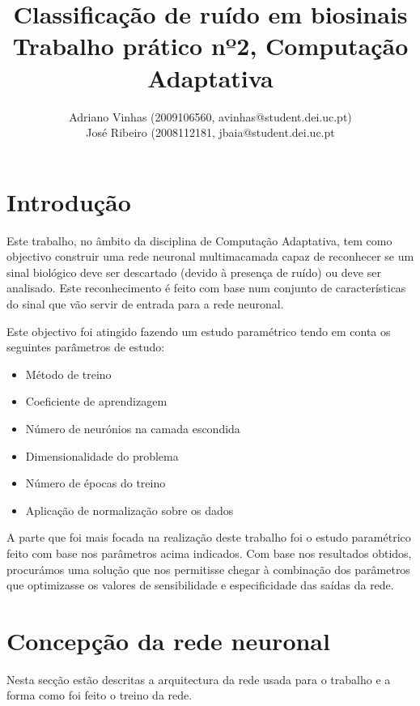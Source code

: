 \documentclass{article}
\begin{document}
\title{Classificação de ruído em biosinais \\ Trabalho prático nº2, Computação Adaptativa}
\author{Adriano Vinhas (2009106560, avinhas@student.dei.uc.pt)\\
		José Ribeiro (2008112181, jbaia@student.dei.uc.pt}
\maketitle
\clearpage

\section{Introdução}

\indent \indent Este trabalho, no âmbito da disciplina de Computação Adaptativa, tem como objectivo construir uma rede neuronal multimacamada capaz de reconhecer se um sinal biológico deve ser descartado (devido à presença de ruído) ou deve ser analisado. Este reconhecimento é feito com base num conjunto de características do sinal que vão servir de entrada para a rede neuronal.

Este objectivo foi atingido fazendo um estudo paramétrico tendo em conta os seguintes parâmetros de estudo:
\begin{itemize}
\item Método de treino
\item Coeficiente de aprendizagem
\item Número de neurónios na camada escondida
\item Dimensionalidade do problema
\item Número de épocas do treino
\item Aplicação de normalização sobre os dados
\end{itemize}

A parte que foi mais focada na realização deste trabalho foi o estudo paramétrico feito com base nos parâmetros acima indicados. Com base nos resultados obtidos, procurámos uma solução que nos permitisse chegar à combinação dos parâmetros que optimizasse os valores de sensibilidade e especificidade das saídas da rede.

\clearpage
\section{Concepção da rede neuronal}
\indent \indent Nesta secção estão descritas a arquitectura da rede usada para o trabalho e a forma como foi feito o treino da rede.
\end{document}
